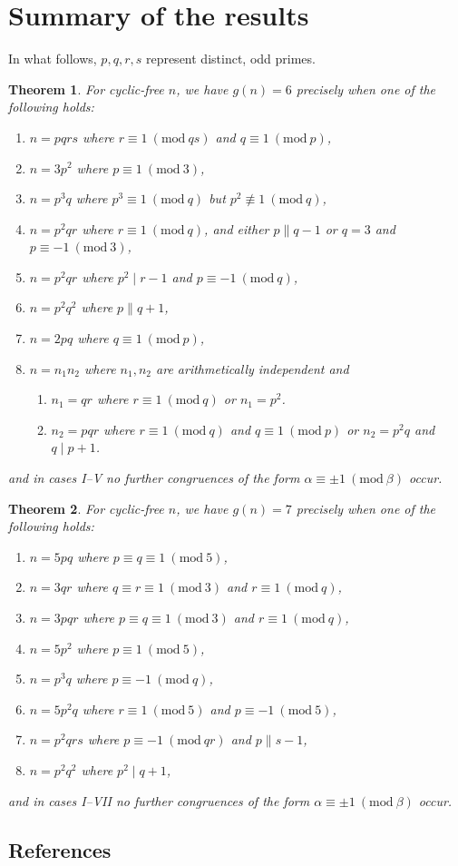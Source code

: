\documentclass{article}
\newcommand{\Mod}[1]{\ (\mathrm{mod} \ #1)}
\theoremstyle{plain}
\newtheorem{thm}{Theorem}[section]
\theoremstyle{definition}
\begin{document}
\nopagebreak \section{Summary of the results}
In what follows, $p, q, r, s$ represent distinct, odd primes.
\nopagebreak
{}
\begin{thm}
	For cyclic-free $n$, we have $g(n) = 6$ precisely when one of the following holds:
	\begin{enumerate} \listspace
		\item $n = pqrs$ where $r \equiv 1 \Mod{qs}$ and $q \equiv 1 \Mod{p}$,
		\item $n = 3p^2$ where $p \equiv 1 \Mod{3}$,
		\item $n = p^3 q$ where $p^3 \equiv 1 \Mod{q}$ but $p^2 \not\equiv 1 \Mod{q}$,
		\item $n = p^2 q r$ where $r \equiv 1 \Mod{q}$, and either $p \parallel q - 1$ or $q = 3$ and $p \equiv -1 \Mod{3}$,
		\item $n = p^2 q r$ where $p^2 \mid r - 1$ and $p \equiv -1 \Mod{q}$,
		\item $n = p^2 q^2$ where $p \parallel q + 1$,
		\item $n = 2pq$ where $q \equiv 1 \Mod{p}$,
		\item $n = n_1 n_2$ where $n_1, n_2$ are arithmetically independent and
		\begin{enumerate}
			\item $n_1 = qr$ where $r \equiv 1 \Mod{q}$ or $n_1 = p^2$.
			\item $n_2 = pqr$ where $r \equiv 1 \Mod{q}$ and $q \equiv 1 \Mod{p}$ or $n_2 = p^2 q$ and $q \mid p + 1$.
		\end{enumerate}
	\end{enumerate} \textspace
	and in cases I--V no further congruences of the form $\alpha \equiv \pm 1 \Mod{\beta}$ \nolinebreak[4] \mbox{occur}.
\end{thm}
\begin{thm}
	For cyclic-free $n$, we have $g(n) = 7$ precisely when one of the following holds:
	\begin{enumerate}	\listspace
		\item $n = 5pq$ where $p \equiv q \equiv 1 \Mod{5}$,
		\item $n = 3qr$ where $q \equiv r \equiv 1 \Mod{3}$ and $r \equiv 1 \Mod{q}$,
		\item $n = 3pqr$ where $p \equiv q \equiv 1 \Mod{3}$ and $r \equiv 1 \Mod{q}$,
		\item $n = 5p^2$ where $p \equiv 1 \Mod{5}$,
		\item $n = p^3 q$ where $p \equiv -1 \Mod{q}$,
		\item $n = 5p^2 q$ where $r \equiv 1 \Mod{5}$ and $p \equiv -1 \Mod{5}$,
		\item $n = p^2 q r s$ where $p \equiv -1 \Mod{qr}$ and $p \parallel s - 1$,
		\item $n = p^2 q^2$ where $p^2 \mid q + 1$,
	\end{enumerate} \textspace
	and in cases I--VII no further congruences of the form $\alpha \equiv \pm 1 \Mod{\beta}$ \nolinebreak[4] \mbox{occur}.
\end{thm}

\begin{center}\section*{References}\end{center}
\printbibliography[heading=none]
\end{document}
